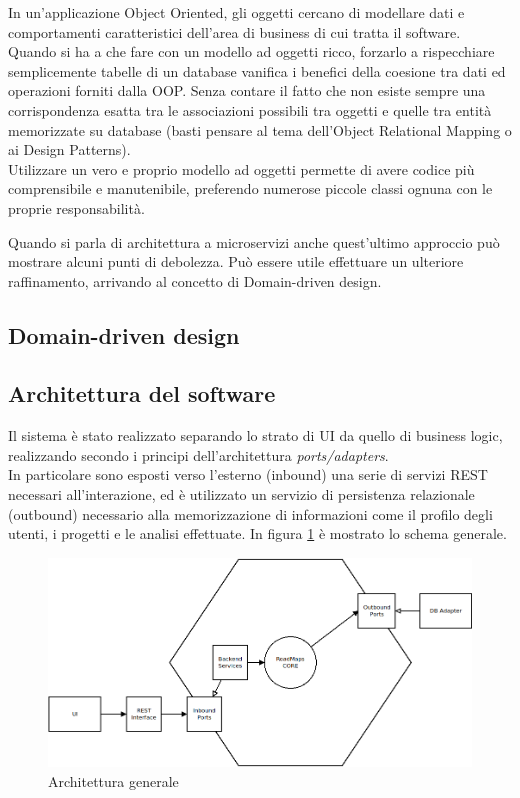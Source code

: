 In un'applicazione Object Oriented, gli oggetti cercano di modellare dati e comportamenti caratteristici dell'area di business di cui tratta il software.
Quando si ha a che fare con un modello ad oggetti ricco, forzarlo a rispecchiare semplicemente tabelle di un database vanifica i benefici della coesione tra dati ed operazioni forniti dalla OOP.
Senza contare il fatto che non esiste sempre una corrispondenza esatta tra le associazioni possibili tra oggetti e quelle tra entità memorizzate su database (basti pensare al tema dell'Object Relational Mapping o ai Design Patterns\cite{design_patterns}).\\
Utilizzare un vero e proprio modello ad oggetti permette di avere codice più comprensibile e manutenibile, preferendo numerose piccole classi ognuna con le proprie responsabilità.

Quando si parla di architettura a microservizi anche quest'ultimo approccio può mostrare alcuni punti di debolezza.
Può essere utile effettuare un ulteriore raffinamento, arrivando al concetto di Domain-driven design.

\subsection{Domain-driven design}


\subsection{Architettura del software}
Il sistema è stato realizzato separando lo strato di UI da quello di business logic, realizzando secondo i principi dell'architettura \textit{ports/adapters}.\\
In particolare sono esposti verso l'esterno (inbound) una serie di servizi REST necessari all'interazione, ed è utilizzato un servizio di persistenza relazionale (outbound) necessario alla memorizzazione di informazioni come il profilo degli utenti, i progetti e le analisi effettuate.
In figura \ref{fig:architecture00} è mostrato lo schema generale.

\begin{figure}[h]
	\centering
	\includegraphics[width=\textwidth]{img/architecture00}
	\caption{Architettura generale}
	\label{fig:architecture00}
\end{figure}

